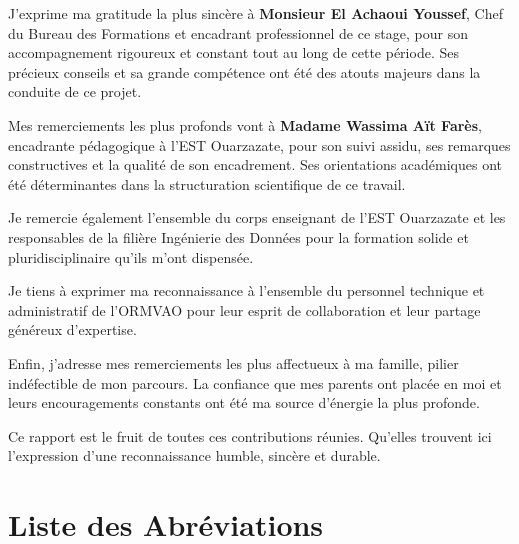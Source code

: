 \documentclass[12pt,a4paper]{report}
\begin{document}
J'exprime ma gratitude la plus sincère à \textbf{Monsieur El Achaoui Youssef}, Chef du Bureau des Formations et encadrant professionnel de ce stage, pour son accompagnement rigoureux et constant tout au long de cette période. Ses précieux conseils et sa grande compétence ont été des atouts majeurs dans la conduite de ce projet.

Mes remerciements les plus profonds vont à \textbf{Madame Wassima Aït Farès}, encadrante pédagogique à l'EST Ouarzazate, pour son suivi assidu, ses remarques constructives et la qualité de son encadrement. Ses orientations académiques ont été déterminantes dans la structuration scientifique de ce travail.

Je remercie également l'ensemble du corps enseignant de l'EST Ouarzazate et les responsables de la filière Ingénierie des Données pour la formation solide et pluridisciplinaire qu'ils m'ont dispensée.

Je tiens à exprimer ma reconnaissance à l'ensemble du personnel technique et administratif de l'ORMVAO pour leur esprit de collaboration et leur partage généreux d'expertise.

Enfin, j'adresse mes remerciements les plus affectueux à ma famille, pilier indéfectible de mon parcours. La confiance que mes parents ont placée en moi et leurs encouragements constants ont été ma source d'énergie la plus profonde.

Ce rapport est le fruit de toutes ces contributions réunies. Qu'elles trouvent ici l'expression d'une reconnaissance humble, sincère et durable.

\chapter*{Liste des Abréviations}
\end{document}
